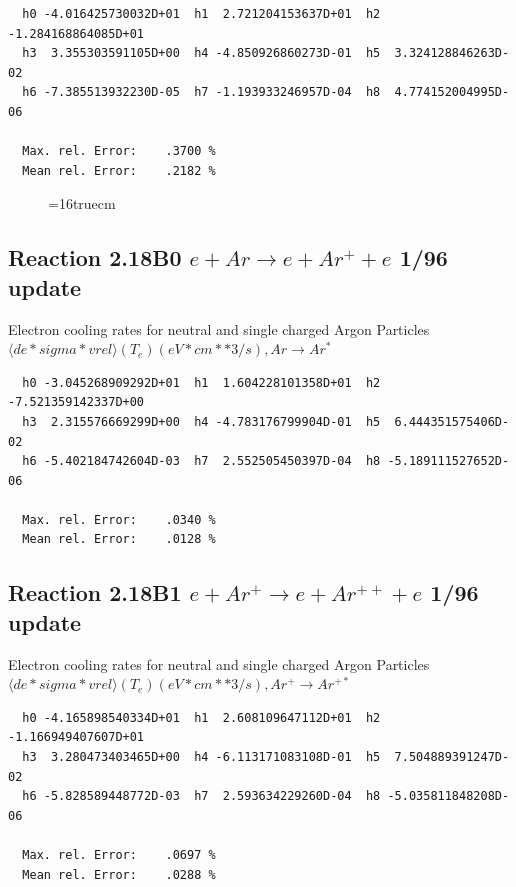 \documentclass[12pt,dvips]{article}
\begin{document}
\begin{small}\begin{verbatim}
  h0 -4.016425730032D+01  h1  2.721204153637D+01  h2 -1.284168864085D+01
  h3  3.355303591105D+00  h4 -4.850926860273D-01  h5  3.324128846263D-02
  h6 -7.385513932230D-05  h7 -1.193933246957D-04  h8  4.774152004995D-06

  Max. rel. Error:    .3700 %
  Mean rel. Error:    .2182 %

\end{verbatim}\end{small}

\begin{figure} \label{2.10l}
\epsfxsize=16truecm
\end{figure}
\newpage

\subsection{
Reaction 2.18B0 $e + Ar  \rightarrow e + Ar^+  + e$ 1/96 update
}

  Electron cooling rates for neutral and single
  charged Argon Particles
 $ \langle de*sigma*vrel \rangle(T_e)  (eV*cm**3/s), Ar  \rightarrow Ar^* $

\begin{small}\begin{verbatim}
  h0 -3.045268909292D+01  h1  1.604228101358D+01  h2 -7.521359142337D+00
  h3  2.315576669299D+00  h4 -4.783176799904D-01  h5  6.444351575406D-02
  h6 -5.402184742604D-03  h7  2.552505450397D-04  h8 -5.189111527652D-06

  Max. rel. Error:    .0340 %
  Mean rel. Error:    .0128 %

\end{verbatim}\end{small}


\subsection{
Reaction 2.18B1 $e + Ar^+ \rightarrow e + Ar^{++} + e$ 1/96 update
}

  Electron cooling rates for neutral and single
  charged Argon Particles
 $  \langle de*sigma*vrel \rangle(T_e)  (eV*cm**3/s), Ar^+ \rightarrow Ar^{+*} $

\begin{small}\begin{verbatim}
  h0 -4.165898540334D+01  h1  2.608109647112D+01  h2 -1.166949407607D+01
  h3  3.280473403465D+00  h4 -6.113171083108D-01  h5  7.504889391247D-02
  h6 -5.828589448772D-03  h7  2.593634229260D-04  h8 -5.035811848208D-06

  Max. rel. Error:    .0697 %
  Mean rel. Error:    .0288 %

\end{verbatim}\end{small}
\end{document}
